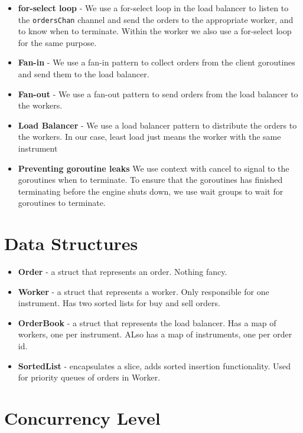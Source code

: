 \documentclass[11pt]{article}
\begin{document}
\begin{itemize}

\item \textbf{for-select loop} - We use a for-select loop in the load balancer to listen to the
    \texttt{ordersChan} channel and send the orders to the appropriate worker, and to know when to
    terminate. Within the worker we also use a for-select loop for the same purpose.
\item \textbf{Fan-in} - We use a fan-in pattern to collect orders from the client goroutines and send them to the load balancer.
\item \textbf{Fan-out} - We use a fan-out pattern to send orders from the load balancer to the workers.
\item \textbf{Load Balancer} - We use a load balancer pattern to distribute the orders to the workers. In our case, least load just means the worker with the same instrument
\item \textbf{Preventing goroutine leaks} We use context with cancel to signal to the goroutines when to
    terminate. To ensure that the goroutines has finished terminating before the engine shuts down,
    we use wait groups to wait for goroutines to terminate.

\end{itemize}

\section{Data Structures}

\begin{itemize}
    \item \textbf{Order} - a struct that represents an order. Nothing fancy.
    \item \textbf{Worker} - a struct that represents a worker. Only responsible for one instrument. Has two sorted lists for buy and sell orders.
    \item \textbf{OrderBook} - a struct that represents the load balancer. Has a map of workers, one per instrument. ALso has a map of instruments, one per order id.
    \item \textbf{SortedList} - encapsulates a slice, adds sorted insertion functionality. Used for priority queues of orders in Worker.
\end{itemize}

\section{Concurrency Level}
\end{document}

